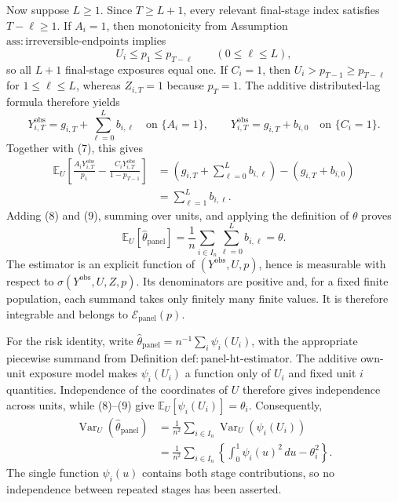 Now suppose \(L\ge1\).  Since \(T\ge L+1\), every relevant final-stage index satisfies \(T-\ell\ge1\).  If \(A_i=1\), then monotonicity from Assumption \(\mathrm{ass:irreversible\text{-}endpoints}\) implies
\[
 U_i\le p_1\le p_{T-\ell}
 \qquad(0\le\ell\le L),
\]
so all \(L+1\) final-stage exposures equal one.  If \(C_i=1\), then \(U_i>p_{T-1}\ge p_{T-\ell}\) for \(1\le\ell\le L\), whereas \(Z_{i,T}=1\) because \(p_T=1\).  The additive distributed-lag formula therefore yields
\[
 Y^{\mathrm{obs}}_{i,T}
 =g_{i,T}+\sum_{\ell=0}^{L}b_{i,\ell}
 \quad\text{on }\{A_i=1\},
 \qquad
 Y^{\mathrm{obs}}_{i,T}=g_{i,T}+b_{i,0}
 \quad\text{on }\{C_i=1\}.
\]
Together with (7), this gives
\[
\begin{aligned}
 \mathbb E_U\left[
 \frac{A_iY^{\mathrm{obs}}_{i,T}}{p_1}
 -\frac{C_iY^{\mathrm{obs}}_{i,T}}{1-p_{T-1}}
 \right]
 &=\left(g_{i,T}+\sum_{\ell=0}^{L}b_{i,\ell}\right)
   -(g_{i,T}+b_{i,0})\\
 &=\sum_{\ell=1}^{L}b_{i,\ell}.
\end{aligned}
\tag{9}
\]
Adding (8) and (9), summing over units, and applying the definition of \(\theta\) proves
\[
 \mathbb E_U[\widehat\theta_{\mathrm{panel}}]
 =\frac1n\sum_{i\in I_n}\sum_{\ell=0}^{L}b_{i,\ell}
 =\theta.
\]
The estimator is an explicit function of \((Y^{\mathrm{obs}},U,p)\), hence is measurable with respect to \(\sigma(Y^{\mathrm{obs}},U,Z,p)\).  Its denominators are positive and, for a fixed finite population, each summand takes only finitely many finite values.  It is therefore integrable and belongs to \(\mathcal E_{\mathrm{panel}}(p)\).

For the risk identity, write \(\widehat\theta_{\mathrm{panel}}=n^{-1}\sum_i\psi_i(U_i)\), with the appropriate piecewise summand from Definition \(\mathrm{def:panel\text{-}ht\text{-}estimator}\).  The additive own-unit exposure model makes \(\psi_i(U_i)\) a function only of \(U_i\) and fixed unit \(i\) quantities.  Independence of the coordinates of \(U\) therefore gives independence across units, while (8)--(9) give \(\mathbb E_U[\psi_i(U_i)]=\theta_i\).  Consequently,
\[
\begin{aligned}
 \operatorname{Var}_U(\widehat\theta_{\mathrm{panel}})
 &=\frac1{n^2}\sum_{i\in I_n}\operatorname{Var}_U(\psi_i(U_i))\\
 &=\frac1{n^2}\sum_{i\in I_n}
 \left\{\int_0^1\psi_i(u)^2\,du-\theta_i^2\right\}.
\end{aligned}
\]
The single function \(\psi_i(u)\) contains both stage contributions, so no independence between repeated stages has been asserted.

